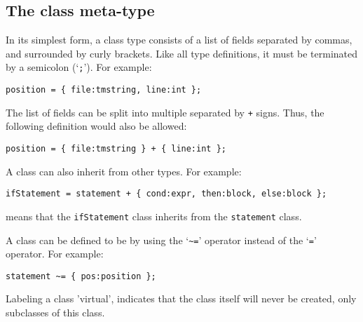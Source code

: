 \subsection{The class meta-type}
In its simplest form, a class type consists of a list of fields separated
by commas, and surrounded by curly brackets.
Like all type definitions, it must be terminated by a semicolon (`\verb';'').
For example:
\begin{showfile}
\begin{verbatim}
position = { file:tmstring, line:int };
\end{verbatim}
\end{showfile}
The list of fields can be split into multiple  separated
by \verb'+' signs. Thus, the following definition would also be allowed:
\begin{showfile}
\begin{verbatim}
position = { file:tmstring } + { line:int };
\end{verbatim}
\end{showfile}
A class can also inherit from other types. 
For example:
\begin{showfile}
\begin{verbatim}
ifStatement = statement + { cond:expr, then:block, else:block };
\end{verbatim}
\end{showfile}
means that the \texttt{ifStatement} class inherits from the \texttt{statement}
class.

A class can be defined to be  by using the `\verb'~=''
operator instead of the `\verb'='' operator. For example:
\begin{showfile}
\begin{verbatim}
statement ~= { pos:position };
\end{verbatim}
\end{showfile}
Labeling a class 'virtual', indicates that the class itself will
never be created, only subclasses of this class.

